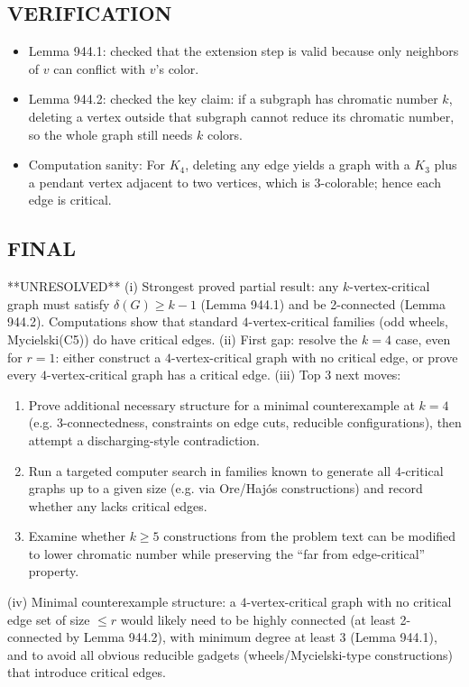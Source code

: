 \subsection*{VERIFICATION}
\begin{itemize}
\item Lemma 944.1: checked that the extension step is valid because only neighbors of $v$ can conflict with $v$'s color.
\item Lemma 944.2: checked the key claim: if a subgraph has chromatic number $k$, deleting a vertex outside that subgraph cannot reduce its chromatic number, so the whole graph still needs $k$ colors.
\item Computation sanity: For $K_4$, deleting any edge yields a graph with a $K_3$ plus a pendant vertex adjacent to two vertices, which is 3-colorable; hence each edge is critical.
\end{itemize}

\subsection*{FINAL}
**UNRESOLVED**
(i) Strongest proved partial result: any $k$-vertex-critical graph must satisfy $\delta(G)\ge k-1$ (Lemma 944.1) and be 2-connected (Lemma 944.2). Computations show that standard $4$-vertex-critical families (odd wheels, Mycielski(C5)) do have critical edges.
(ii) First gap: resolve the $k=4$ case, even for $r=1$: either construct a $4$-vertex-critical graph with no critical edge, or prove every $4$-vertex-critical graph has a critical edge.
(iii) Top 3 next moves:
\begin{enumerate}
\item Prove additional necessary structure for a minimal counterexample at $k=4$ (e.g. 3-connectedness, constraints on edge cuts, reducible configurations), then attempt a discharging-style contradiction.
\item Run a targeted computer search in families known to generate all $4$-critical graphs up to a given size (e.g. via Ore/Haj\'{o}s constructions) and record whether any lacks critical edges.
\item Examine whether $k\ge 5$ constructions from the problem text can be modified to lower chromatic number while preserving the ``far from edge-critical'' property.
\end{enumerate}
(iv) Minimal counterexample structure: a $4$-vertex-critical graph with no critical edge set of size $\le r$ would likely need to be highly connected (at least 2-connected by Lemma 944.2), with minimum degree at least 3 (Lemma 944.1), and to avoid all obvious reducible gadgets (wheels/Mycielski-type constructions) that introduce critical edges.



